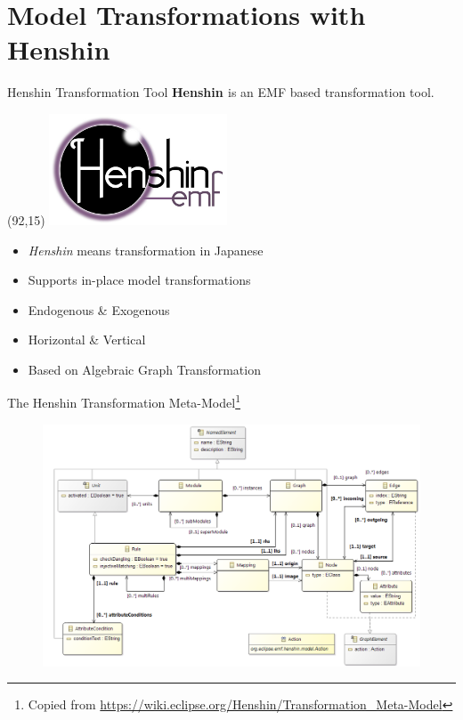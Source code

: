 \documentclass[10pt]{beamer}
\begin{document}
\section{Model Transformations with Henshin}

\begin{frame}{Henshin Transformation Tool}
	\textbf{Henshin \cite{Arendt:2010:HAC:1926458.1926471}} is an EMF \cite{steinberg2008emf} based transformation tool.
	
	\begin{textblock}{20}(92,15)
		\includegraphics[scale=1.0]{./images/henshin_logo.png}
    \end{textblock}		
	
	\begin{itemize}
		\item \textit{Henshin} means transformation in Japanese
		\item Supports in-place model transformations
		\item Endogenous \& Exogenous
		\item Horizontal \& Vertical
	\end{itemize}
	
	\begin{itemize}
		\item Based on Algebraic Graph Transformation \cite{DBLP:series/eatcs/EhrigEPT06}
	\end{itemize}
\end{frame}

\begin{frame}{The Henshin Transformation Meta-Model\footnote{Copied from \url{https://wiki.eclipse.org/Henshin/Transformation\_Meta-Model}}}
	\begin{figure}[H]
		\centering
		\includegraphics[width=1.0\textwidth]{Henshin_Transformation_Modules}
	\end{figure} 
\end{frame}
\end{document}
